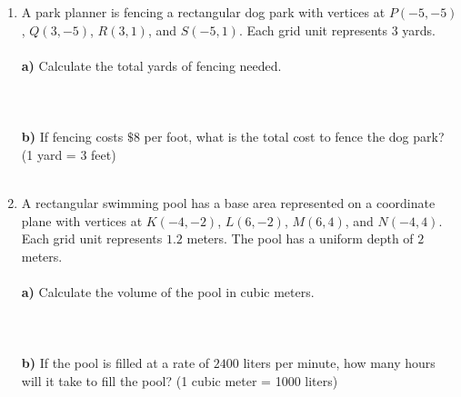 \documentclass[12pt, letterpaper, fleqn]{article}
\newcommand{\blanklong}{\underline{\hspace{6.5cm}}}
\begin{document}
\begin{enumerate}[itemsep=3cm, leftmargin=0.6cm]
\item A park planner is fencing a rectangular dog park with vertices at $P(-5, -5)$, $Q(3, -5)$, $R(3, 1)$, and $S(-5, 1)$. Each grid unit represents $3$ yards. \\ \\
\textbf{a)} Calculate the total yards of fencing needed. \\ \\
\blanklong \\ \\
\textbf{b)} If fencing costs $\$8$ per foot, what is the total cost to fence the dog park? (1 yard = 3 feet) \\ \\
\blanklong 

\item A rectangular swimming pool has a base area represented on a coordinate plane with vertices at $K(-4, -2)$, $L(6, -2)$, $M(6, 4)$, and $N(-4, 4)$. Each grid unit represents $1.2$ meters. The pool has a uniform depth of $2$ meters. \\ \\
\textbf{a)} Calculate the volume of the pool in cubic meters. \\ \\
\blanklong \\ \\
\textbf{b)} If the pool is filled at a rate of $2400$ liters per minute, how many hours will it take to fill the pool? (1 cubic meter = 1000 liters) \\ \\
\blanklong
\end{enumerate}
\end{document}

